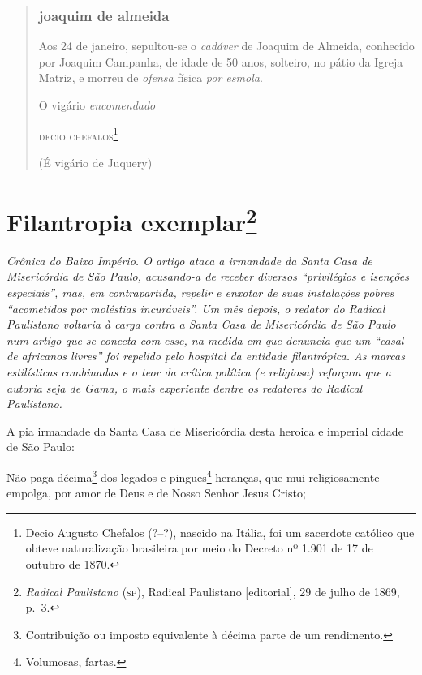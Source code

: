 \begin{quote}
\subsection{joaquim de almeida}

Aos 24 de janeiro, sepultou-se o \emph{cadáver} de Joaquim de
Almeida, conhecido por Joaquim Campanha, de idade de 50 anos, solteiro,
no pátio da Igreja Matriz, e morreu de \emph{ofensa} física
\emph{por esmola}.

\begin{flushright}
O vigário \emph{encomendado}

\textsc{decio chefalos}\footnote{Decio Augusto Chefalos (?--?), nascido na
  Itália, foi um sacerdote católico que obteve naturalização brasileira
  por meio do Decreto nº 1.901 de 17 de outubro de 1870.}

(É vigário de Juquery)
\end{flushright}
\end{quote}

\chapter{Filantropia exemplar\footnote{\emph{Radical Paulistano} (\textsc{sp}),
  Radical Paulistano {[}editorial{]}, 29 de julho de 1869, p.~3.}}

\begin{didascalia}\itshape
Crônica do Baixo Império. O artigo ataca a irmandade da Santa Casa de
Misericórdia de São Paulo, acusando-a de receber diversos ``privilégios e
isenções especiais'', mas, em contrapartida, repelir e enxotar de suas
instalações pobres ``acometidos por moléstias incuráveis''. Um mês depois,
o redator do \textnormal{Radical Paulistano} voltaria à carga contra a Santa
Casa de Misericórdia de São Paulo num artigo que se conecta com esse, na
medida em que denuncia que um ``casal de africanos livres'' foi repelido
pelo hospital da entidade filantrópica. As marcas estilísticas
combinadas e o teor da crítica política (e religiosa) reforçam que a
autoria seja de Gama, o mais experiente dentre os redatores do \textnormal{Radical
Paulistano}.
\end{didascalia}



A pia irmandade da Santa Casa de Misericórdia desta heroica e imperial
cidade de São Paulo:

Não paga décima\footnote{Contribuição ou imposto equivalente à décima
  parte de um rendimento.} dos legados e pingues\footnote{Volumosas,
  fartas.} heranças, que mui religiosamente empolga, por amor de Deus e
de Nosso Senhor Jesus Cristo;

